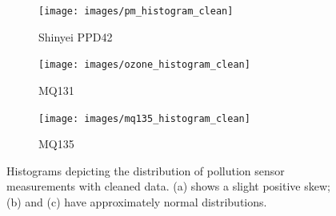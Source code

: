 \documentclass[11pt]{report}
\begin{document}
\begin{figure}[!tbp]
    \centering
    \begin{minipage}{1\linewidth}
            \begin{subfigure}[t]{.5\linewidth}
                \texttt{[image: images/pm\_histogram\_clean]}
                \caption{Shinyei PPD42}
                \label{fig:pm_histogram_clean}
            \end{subfigure}
            \begin{subfigure}[t]{.5\linewidth}
            	\texttt{[image: images/ozone\_histogram\_clean]}
            	\caption{MQ131}
            	\label{fig:ozone_histogram_clean}
	   \end{subfigure}
        \end{minipage}
    \begin{minipage}{1\linewidth}
            \begin{subfigure}[t]{.5\linewidth}
                \texttt{[image: images/mq135\_histogram\_clean]}
                \caption{MQ135}
                \label{fig:mq135_histogram_clean}
            \end{subfigure}
    \end{minipage}
    \caption[Sensor measurement histograms with cleaned data.]{Histograms depicting the distribution of pollution sensor measurements with cleaned data. (a) shows a slight positive skew; (b) and (c) have approximately normal distributions.}
    \label{fig:histograms_clean}
\end{figure}
\end{document}
